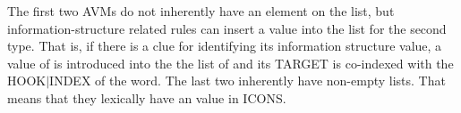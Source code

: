 

\noindent The first two AVMs do not inherently have an 
element on the  list, but
information-structure related rules can insert a value into the list
for the second type.  That is, if there is a clue for identifying its
information structure value, a value of  is introduced
into the the list of  and its TARGET is co-indexed with the
HOOK{$\mid$}INDEX of the word.  The last two inherently have non-empty
 lists. That means that they lexically have an
 value in ICONS.



